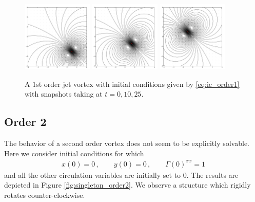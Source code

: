 \documentclass[12pt]{amsart}
\theoremstyle{remark}
\begin{document}
\begin{figure}[h!]
	\centering
	\includegraphics[width = 0.3\textwidth]{./images/singleton_order1/order_1_time_0}
	\includegraphics[width = 0.3\textwidth]{./images/singleton_order1/order_1_time_10}
	\includegraphics[width = 0.3\textwidth]{./images/singleton_order1/order_1_time_25}
	\caption{A $1$st order jet vortex with initial conditions given by \eqref{eq:ic_order1}
		with snapshots taking at $t=0,10,25$.}
	\label{fig:singleton_order1}
\end{figure}

\subsection{Order 2}
The behavior of a second order vortex does not seem to be explicitly solvable.
Here we consider initial conditions for which 
\begin{align}
	x(0) = 0 \,,\quad\quad y(0) = 0 \,,\quad\quad \Gamma(0)^{xx} = 1 \label{eq:ic_order2}
\end{align}
and all the other circulation variables are initially set to $0$.
The results are depicted in Figure \ref{fig:singleton_order2}.
We observe a structure which rigidly rotates counter-clockwise.
\end{document}
